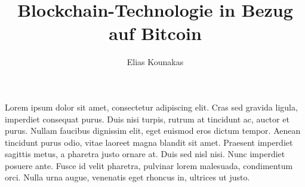 \documentclass[12pt]{article}
\title{Blockchain-Technologie in Bezug auf Bitcoin}
\author{Elias Kounakas}
\begin{document}
\maketitle
Lorem ipsum dolor sit amet, consectetur adipiscing elit. Cras sed gravida ligula, imperdiet consequat purus. Duis nisi turpis, rutrum at tincidunt ac, auctor et purus. Nullam faucibus dignissim elit, eget euismod eros dictum tempor. Aenean tincidunt purus odio, vitae laoreet magna blandit sit amet. Praesent imperdiet sagittis metus, a pharetra justo ornare at. Duis sed nisl nisi. Nunc imperdiet posuere ante. Fusce id velit pharetra, pulvinar lorem malesuada, condimentum orci. Nulla urna augue, venenatis eget rhoncus in, ultrices ut justo. 
\end{document}
